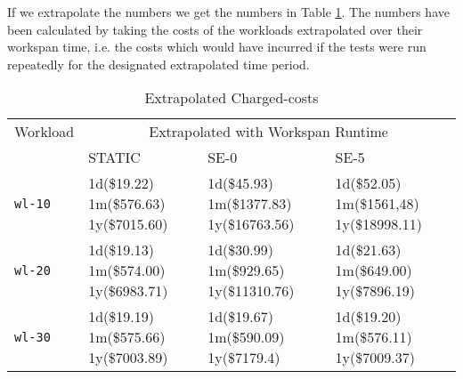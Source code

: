 
If we extrapolate the numbers we get the numbers in Table
\ref{table_extrapolatedchargedcosts}. The numbers have been calculated by
taking the costs of the workloads extrapolated over their workspan
time, i.e. the costs which would have incurred if the tests were run
repeatedly for the designated extrapolated time period.


\begin{table}
\caption{Extrapolated Charged-costs}
\label{table_extrapolatedchargedcosts}
\centering
\begin{tabular}{|l|p{1.5cm}|p{1.5cm}|p{1.5cm}|}
\hline
Workload & \multicolumn{3}{|c|}{Extrapolated with Workspan Runtime}\\
\cline{2-4}
 & STATIC & SE-0 & SE-5 \\
\hline
\texttt{wl-10} &
1d(\$19.22) 1m(\$576.63) 1y(\$7015.60) &
1d(\$45.93) 1m(\$1377.83) 1y(\$16763.56) &
1d(\$52.05) 1m(\$1561,48) 1y(\$18998.11)\\
\hline
\texttt{wl-20} &
1d(\$19.13) 1m(\$574.00) 1y(\$6983.71) &
1d(\$30.99) 1m(\$929.65) 1y(\$11310.76) &
1d(\$21.63) 1m(\$649.00) 1y(\$7896.19) \\
\hline
\texttt{wl-30} &
1d(\$19.19) 1m(\$575.66) 1y(\$7003.89) &
1d(\$19.67) 1m(\$590.09) 1y(\$7179.4) &
1d(\$19.20) 1m(\$576.11) 1y(\$7009.37)\\
\hline
\end{tabular}
\end{table}
